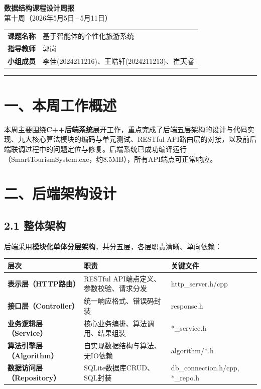 \documentclass[12pt,a4paper]{article}
\begin{document}
\begin{center}
    {\LARGE\bfseries\color{headblue} 数据结构课程设计周报}\\[6pt]
    {\Large 第十周（2026年5月5日\,--\,5月11日）}\\[12pt]
    \begin{tabular}{ll}
        \bfseries 课题名称 & 基于智能体的个性化旅游系统 \\
        \bfseries 指导教师 & 郭岗 \\
        \bfseries 小组成员 & 李佳(2024211216)、王皓轩(2024211213)、崔天睿 \\
    \end{tabular}
\end{center}

\rule{\textwidth}{0.8pt}

\section*{一、本周工作概述}

本周主要围绕\textbf{C++后端系统}展开工作，重点完成了后端五层架构的设计与代码实现、九大核心算法模块的编码与单元测试、RESTful API路由层的对接，以及前后端联调过程中的问题定位与修复。后端系统已成功编译运行（SmartTourismSystem.exe，约8.5MB），所有API端点可正常响应。

\section*{二、后端架构设计}

\subsection*{2.1 整体架构}

后端采用\textbf{模块化单体分层架构}，共分五层，各层职责清晰、单向依赖：

\begin{center}
\begin{tabular}{>{\bfseries}l l l}
    \toprule
    层次 & 职责 & 关键文件 \\
    \midrule
    表示层（HTTP路由） & RESTful API端点定义、参数校验、请求分发 & http\_server.h/cpp \\
    接口层（Controller） & 统一响应格式、错误码封装 & response.h \\
    业务逻辑层（Service） & 核心业务编排、算法调用、结果组装 & *\_service.h \\
    算法引擎层（Algorithm） & 自实现数据结构与算法、无IO依赖 & algorithm/*.h \\
    数据访问层（Repository） & SQLite数据库CRUD、SQL封装 & db\_connection.h/cpp, *_repo.h \\
    \bottomrule
\end{tabular}
\end{center}
\end{document}
